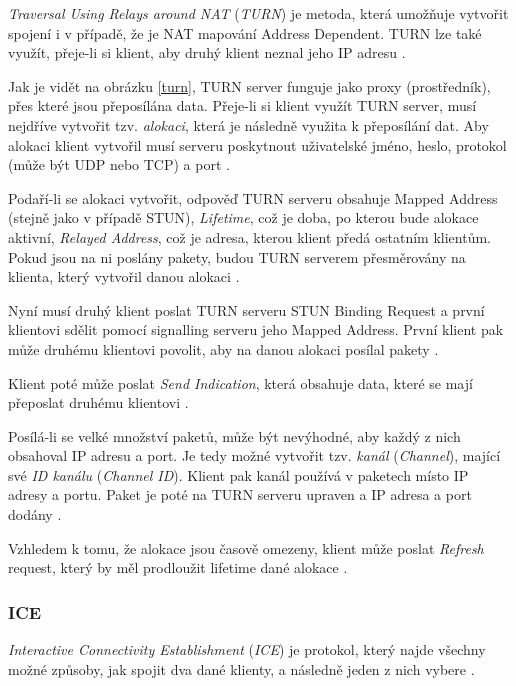 \textit{Traversal Using Relays around NAT} (\textit{TURN}) je metoda, která
umožňuje vytvořit spojení i v případě, že je NAT mapování Address Dependent.
TURN lze také využít, přeje-li si klient, aby druhý klient neznal jeho IP adresu
\cite{WebRTCForTheCurious}.

Jak je vidět na obrázku \ref{turn}, TURN server funguje jako proxy (prostředník),
přes které jsou přeposílána data. Přeje-li si klient využít TURN server, musí
nejdříve vytvořit tzv. \textit{alokaci}, která je následně využita k přeposílání
dat. Aby alokaci klient vytvořil musí serveru poskytnout uživatelské jméno,
heslo, protokol (může být UDP nebo TCP) a port \cite{WebRTCForTheCurious}.

Podaří-li se alokaci vytvořit, odpověď TURN serveru obsahuje Mapped Address
(stejně jako v případě STUN), \textit{Lifetime}, což je doba, po kterou bude
alokace aktivní, \textit{Relayed Address}, což je adresa, kterou klient předá
ostatním klientům. Pokud jsou na ni poslány pakety, budou TURN serverem
přesměrovány na klienta, který vytvořil danou alokaci
\cite{WebRTCForTheCurious}.

Nyní musí druhý klient poslat TURN serveru STUN Binding Request a první
klientovi sdělit pomocí signalling serveru jeho Mapped Address. První klient pak
může druhému klientovi povolit, aby na danou alokaci posílal pakety
\cite{WebRTCForTheCurious}.

Klient poté může poslat \textit{Send Indication}, která obsahuje data, které se
mají přeposlat druhému klientovi \cite{WebRTCForTheCurious}.

Posílá-li se velké množství paketů, může být nevýhodné, aby každý z nich
obsahoval IP adresu a port. Je tedy možné vytvořit tzv. \textit{kanál}
(\textit{Channel}), mající své \textit{ID kanálu} (\textit{Channel ID}). Klient
pak kanál používá v paketech místo IP adresy a portu. Paket je poté na TURN
serveru upraven a IP adresa a port dodány \cite{WebRTCForTheCurious}.

Vzhledem k tomu, že alokace jsou časově omezeny, klient může poslat
\textit{Refresh} request, který by měl prodloužit lifetime dané alokace
\cite{WebRTCForTheCurious}.

\subsubsection{ICE}\label{ice}

\textit{Interactive Connectivity Establishment} (\textit{ICE}) je protokol,
který najde všechny možné způsoby, jak spojit dva dané klienty, a následně jeden
z nich vybere \cite{WebRTCForTheCurious}.

